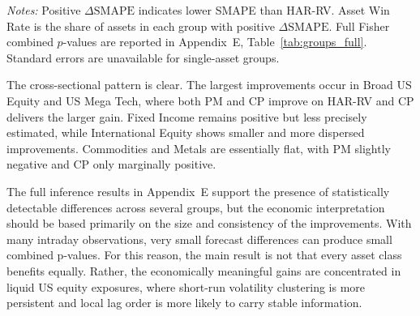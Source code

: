 ﻿\documentclass[11pt,a4paper]{article}
\begin{document}
{\renewcommand{\thetable}{5}
\begin{center}
\label{tab:groups}
\small
\renewcommand{\arraystretch}{1.15}
\setlength{\tabcolsep}{5pt}

\vspace{0.1cm}
\footnotesize \parbox{0.92\textwidth}{\textit{Notes:} Positive $\Delta \mathrm{SMAPE}$ indicates lower SMAPE than HAR-RV. Asset Win Rate is the share of assets in each group with positive $\Delta \mathrm{SMAPE}$. Full Fisher combined $p$-values are reported in Appendix~E, Table~\ref{tab:groups_full}. Standard errors are unavailable for single-asset groups.}
\end{center}}

\noindent
The cross-sectional pattern is clear. The largest improvements occur in Broad US Equity and US Mega Tech, where both PM and CP improve on HAR-RV and CP delivers the larger gain. Fixed Income remains positive but less precisely estimated, while International Equity shows smaller and more dispersed improvements. Commodities and Metals are essentially flat, with PM slightly negative and CP only marginally positive.

\noindent
The full inference results in Appendix~E support the presence of statistically detectable differences across several groups, but the economic interpretation should be based primarily on the size and consistency of the improvements. With many intraday observations, very small forecast differences can produce small combined p-values. For this reason, the main result is not that every asset class benefits equally. Rather, the economically meaningful gains are concentrated in liquid US equity exposures, where short-run volatility clustering is more persistent and local lag order is more likely to carry stable information.
\end{document}
